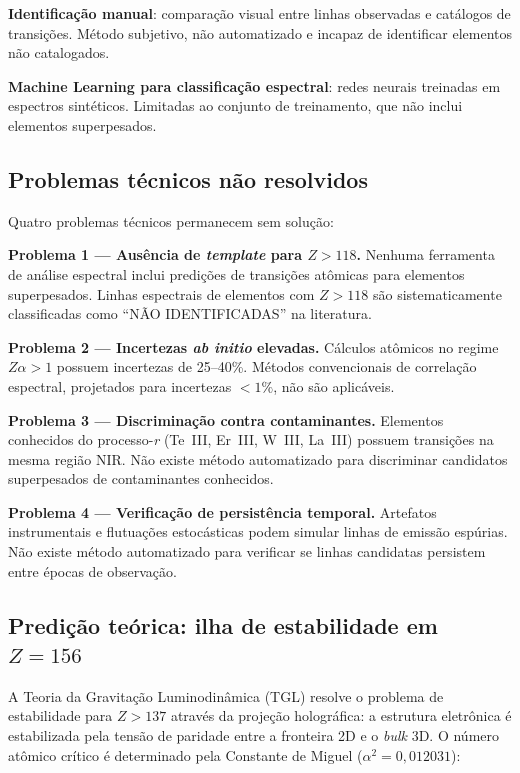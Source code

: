 \documentclass[12pt,a4paper]{article}
\newcommand{\alphaii}{\alpha^2}
\begin{document}
\textbf{Identificação manual}: comparação visual entre linhas
observadas e catálogos de transições. Método subjetivo, não
automatizado e incapaz de identificar elementos não catalogados.

\textbf{Machine Learning para classificação espectral}: redes
neurais treinadas em espectros sintéticos. Limitadas ao conjunto
de treinamento, que não inclui elementos superpesados.

\subsection{Problemas técnicos não resolvidos}

Quatro problemas técnicos permanecem sem solução:

\textbf{Problema 1 --- Ausência de \textit{template} para $Z > 118$.}
Nenhuma ferramenta de análise espectral inclui predições de
transições atômicas para elementos superpesados. Linhas espectrais
de elementos com $Z > 118$ são sistematicamente classificadas como
``NÃO IDENTIFICADAS'' na literatura.

\textbf{Problema 2 --- Incertezas \textit{ab initio} elevadas.}
Cálculos atômicos no regime $Z\alpha > 1$ possuem incertezas de
25--40\%. Métodos convencionais de correlação espectral, projetados
para incertezas $< 1\%$, não são aplicáveis.

\textbf{Problema 3 --- Discriminação contra contaminantes.}
Elementos conhecidos do processo-\textit{r} (Te~III, Er~III,
W~III, La~III) possuem transições na mesma região NIR. Não existe
método automatizado para discriminar candidatos superpesados de
contaminantes conhecidos.

\textbf{Problema 4 --- Verificação de persistência temporal.}
Artefatos instrumentais e flutuações estocásticas podem simular
linhas de emissão espúrias. Não existe método automatizado para
verificar se linhas candidatas persistem entre épocas de observação.

\subsection{Predição teórica: ilha de estabilidade em $Z = 156$}

A Teoria da Gravitação Luminodinâmica (TGL) resolve o problema de
estabilidade para $Z > 137$ através da projeção holográfica: a
estrutura eletrônica é estabilizada pela tensão de paridade entre
a fronteira 2D e o \textit{bulk} 3D. O número atômico crítico é
determinado pela Constante de Miguel ($\alphaii = 0{,}012031$):
\end{document}
